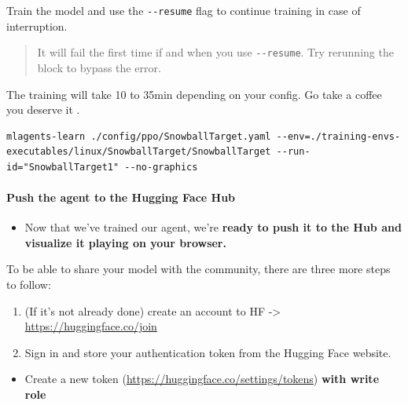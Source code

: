 \documentclass[11pt,a4paper]{article}
\begin{document}

Train the model and use the \texttt{-\/-resume} flag to continue training in case of interruption.

\begin{quote}
It will fail the first time if and when you use \texttt{-\/-resume}. Try rerunning the block to bypass the error.
\end{quote}

The training will take 10 to 35min depending on your config. Go take a coffee you deserve it .

\begin{lstlisting}
mlagents-learn ./config/ppo/SnowballTarget.yaml --env=./training-envs-executables/linux/SnowballTarget/SnowballTarget --run-id="SnowballTarget1" --no-graphics
\end{lstlisting}

\paragraph{Push the agent to the Hugging Face Hub}\label{push-the-agent-to-the-hugging-face-hub}

\begin{itemize}
\tightlist
\item
  Now that we've trained our agent, we're \textbf{ready to push it to the Hub and visualize it playing on your browser.}
\end{itemize}

To be able to share your model with the community, there are three more steps to follow:

\begin{enumerate}
\def\labelenumi{\arabic{enumi}.}
\item
  (If it's not already done) create an account to HF -\textgreater{} \url{https://huggingface.co/join}
\item
  Sign in and store your authentication token from the Hugging Face website.
\end{enumerate}

\begin{itemize}
\tightlist
\item
  Create a new token (\url{https://huggingface.co/settings/tokens}) \textbf{with write role}
\end{itemize}
\end{document}
